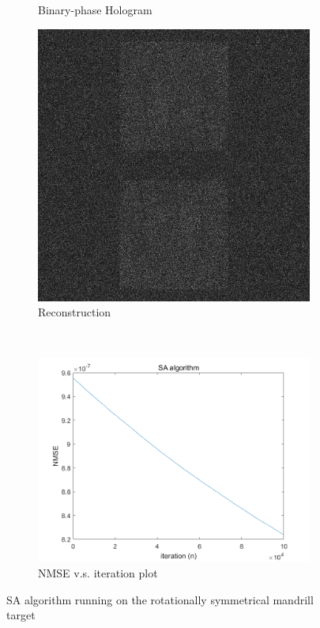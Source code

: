 \begin{figure}[H]
\begin{subfigure}[t]{0.3\textwidth}
    \caption{Binary-phase Hologram}
    \label{fig:SA_mandrill_2_Holo}
  \end{subfigure}
  \hfill
  \begin{subfigure}[t]{0.3\textwidth}
    \centering
    \includegraphics[width=\textwidth]{SA_mandrill_2_recon_intensity.jpg}
    \caption{Reconstruction}
    \label{fig:SA_mandrill_2_recon_intensity}
  \end{subfigure}
  \\
  \begin{subfigure}[t]{0.7\textwidth}
    \centering
    \includegraphics[width=\textwidth]{SA_mandrill_convergence.png}
    \caption{NMSE v.s. iteration plot}
    \label{fig:SA_mandrill_2_convergence}
  \end{subfigure}
  \caption{SA algorithm running on the rotationally symmetrical mandrill target}
  \label{fig:SA algorithm running on the rotationally symmetrical mandrill target}
\end{figure}

